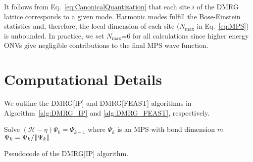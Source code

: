 \documentclass[journal=jctcce]{achemso}
\newcommand{\opr}[1]{\mathcal{#1}}
\begin{document}
\noindent It follows from Eq.~\ref{eq:CanonicalQuantization} that each site $i$ of the DMRG lattice corresponds to a given mode.
Harmonic modes fulfill the Bose-Einstein statistics and, therefore, the local dimension of each site ($N_\text{max}$ in Eq.~\ref{eq:MPS}) is unbounded.
In practice, we set $N_\text{max}$=6 for all calculations since higher energy ONVs give negligible contributions to the final MPS wave function.

\section{Computational Details}
\label{sec:computationalDetails}

We outline the DMRG[IP] and DMRG[FEAST] algorithms in Algorithm~\ref{alg:DMRG_IP} and \ref{alg:DMRG_FEAST}, respectively. 
%
\begin{algorithm}[htbp!]
  \begin{algorithmic}[1]
    \State Solve $(\opr{H} - \eta) \Psi_{k} = \Psi_{k-1}$ where $\Psi_{k}$  is an MPS with bond dimension $m$
    \State $\Psi_{k} = \Psi_{k}/\norm{\Psi_{k}}$
    \EndFor
  \EndProcedure
  \end{algorithmic}
  \caption{Pseudocode of the DMRG[IP] algorithm.}
  \label{alg:DMRG_IP}
\end{algorithm}
%
\end{document}
